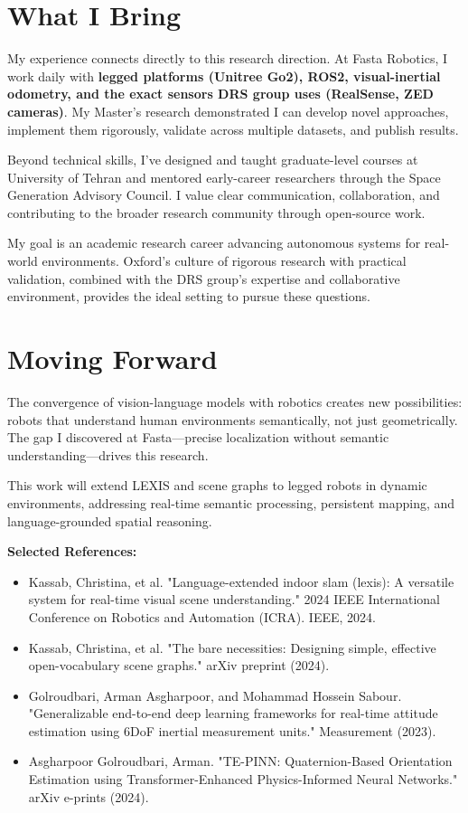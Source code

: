 \documentclass[12pt]{article}
\begin{document}
\section*{What I Bring}

My experience connects directly to this research direction. At Fasta Robotics, I work daily with \textbf{legged platforms (Unitree Go2), ROS2, visual-inertial odometry, and the exact sensors DRS group uses (RealSense, ZED cameras)}. My Master's research demonstrated I can develop novel approaches, implement them rigorously, validate across multiple datasets, and publish results.

Beyond technical skills, I've designed and taught graduate-level courses at University of Tehran and mentored early-career researchers through the Space Generation Advisory Council. I value clear communication, collaboration, and contributing to the broader research community through open-source work.

My goal is an academic research career advancing autonomous systems for real-world environments. Oxford's culture of rigorous research with practical validation, combined with the DRS group's expertise and collaborative environment, provides the ideal setting to pursue these questions.

\section*{Moving Forward}

The convergence of vision-language models with robotics creates new possibilities: robots that understand human environments semantically, not just geometrically. The gap I discovered at Fasta—precise localization without semantic understanding—drives this research.

This work will extend LEXIS and scene graphs to legged robots in dynamic environments, addressing real-time semantic processing, persistent mapping, and language-grounded spatial reasoning.

\vspace{0.5cm}
\noindent\textbf{Selected References:}

\begin{itemize}
\item Kassab, Christina, et al. "Language-extended indoor slam (lexis): A versatile system for real-time visual scene understanding." 2024 IEEE International Conference on Robotics and Automation (ICRA). IEEE, 2024.

\item Kassab, Christina, et al. "The bare necessities: Designing simple, effective open-vocabulary scene graphs." arXiv preprint (2024).

\item Golroudbari, Arman Asgharpoor, and Mohammad Hossein Sabour. "Generalizable end-to-end deep learning frameworks for real-time attitude estimation using 6DoF inertial measurement units." Measurement (2023).

\item Asgharpoor Golroudbari, Arman. "TE-PINN: Quaternion-Based Orientation Estimation using Transformer-Enhanced Physics-Informed Neural Networks." arXiv e-prints (2024).

\end{itemize}
\end{document}
